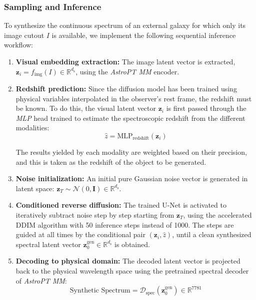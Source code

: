\subsubsection{Sampling and Inference}
To synthesize the continuous spectrum of an external galaxy for which only its image cutout $I$ is available, we implement the following sequential inference workflow:
\begin{enumerate}
	\item \textbf{Visual embedding extraction:} The image latent vector is extracted, $\mathbf{z}_i = f_{\text{img}}(I) \in \mathbb{R}^{d_\text{s}}$, using the \textit{AstroPT MM} encoder.

	\item \textbf{Redshift prediction:} Since the diffusion model has been trained using physical variables interpolated in the observer's rest frame, the redshift must be known. To do this, the visual latent vector $\mathbf{z}_i$ is first passed through the \textit{\gls{MLP}} head trained to estimate the spectroscopic redshift from the different modalities:
	\begin{equation}
	\hat{z} = \text{MLP}_{\text{redshift}}(\mathbf{z}_i)
	\label{eq:ap_z_pred}
	\end{equation}

	The results yielded by each modality are weighted based on their precision, and this is taken as the redshift of the object to be generated.

	\item \textbf{Noise initialization:} An initial pure Gaussian noise vector is generated in latent space: $\mathbf{z}_T \sim \mathcal{N}(0, \mathbf{I}) \in \mathbb{R}^{d_\text{s}}$.

	\item \textbf{Conditioned reverse diffusion:} The trained U-Net is activated to iteratively subtract noise step by step starting from $\mathbf{z}_T$, using the accelerated DDIM algorithm \autocite{ar:song-2020} with 50 inference steps instead of 1000. The steps are guided at all times by the conditional pair $(\mathbf{z}_i, \hat{z})$, until a clean synthesized spectral latent vector $\mathbf{z}_0^{\text{gen}} \in \mathbb{R}^{d_\text{s}}$ is obtained.

	\item \textbf{Decoding to physical domain:} The decoded latent vector is projected back to the physical wavelength space using the pretrained spectral decoder of \textit{AstroPT MM}:
	\begin{equation}
	\text{Synthetic Spectrum} = \mathcal{D}_{\text{spec}}(\mathbf{z}_0^{\text{gen}}) \in \mathbb{R}^{7781}
	\label{eq:ap_spec_decode}
	\end{equation}
\end{enumerate}


